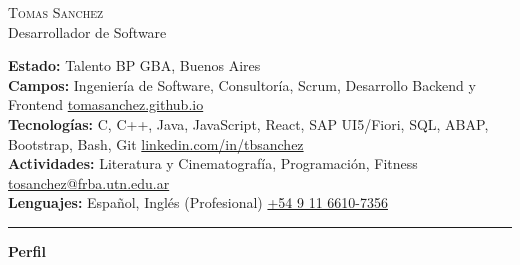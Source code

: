 \documentclass[10pt,A4]{article}
\newcommand{\cvsection}[1]
{
	\begin{center}
		\large\textcolor{sectcol}{\textbf{#1}}
	\end{center}
}
\newcommand{\metasection}[2]
{
\footnotesize{#2} \hspace*{\fill} \footnotesize{#1}\\[1pt]
}
\begin{document}
\pagestyle{fancy}








\vspace{-8pt}
\begin{center}
	\HUGE \textsc{Tomas Sanchez} \\[2pt]
	\small Desarrollador de Software
\end{center}



\vspace{6pt}


\metasection{GBA, Buenos Aires}{\textbf{Estado:} Talento BP}
\metasection{\href{https://tomasanchez.github.io}{tomasanchez.github.io}}{\textbf{Campos:} Ingeniería de Software, Consultoría, Scrum, Desarrollo Backend y Frontend}
\metasection{\href{https://www.linkedin.com/in/tbsanchez/}{linkedin.com/in/tbsanchez}}{\textbf{Tecnologías:} C, C++, Java, JavaScript, React, SAP UI5/Fiori, SQL, ABAP, Bootstrap, Bash, Git}
\metasection{\href{mailto:tosanchez@frba.utn.edu.ar}{tosanchez@frba.utn.edu.ar}}{\textbf{Actividades:} Literatura y Cinematografía, Programación, Fitness}
\metasection{\href{tel:+5491166107356}{+54 9 11 6610-7356}}{\textbf{Lenguajes:} Español, Inglés (Profesional)}
\vspace{-2pt}
\textcolor{softcol}{\hrule}
\vspace{6pt}

\normalsize

\vspace{-6pt}
\cvsection{Perfil}
\end{document}
